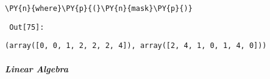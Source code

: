 {\par%
\vspace{-1\baselineskip}%
}%
\begin{notebookcell}[75]%
\begin{addmargin}[\cellleftmargin]{0em}%
{\smaller%
\par%
%
\vspace{-1\smallerfontscale}%
\begin{Verbatim}[commandchars=\\\{\}]
\PY{n}{where}\PY{p}{(}\PY{n}{mask}\PY{p}{)}
\end{Verbatim}
%
\par%
\vspace{-1\smallerfontscale}}%
\end{addmargin}
\end{notebookcell}

\par\vspace{1\smallerfontscale}%
    
        {\par%
        \vspace{-1\smallerfontscale}%
        \noindent%
        \begin{minipage}{\cellleftmargin}%
    \hfill%
    {\smaller%
    \tt%
    \color{nbframe-out-prompt}%
    Out[75]:}%
    \hspace{\inputpadding}%
    \hspace{0em}%
    \hspace{3pt}%
    \end{minipage}%
        }%
    \begin{addmargin}[\cellleftmargin]{0em}%
    {\smaller%
    \vspace{-1\smallerfontscale}%
    
    
    
    \begin{verbatim}
(array([0, 0, 1, 2, 2, 2, 4]), array([2, 4, 1, 0, 1, 4, 0]))
    \end{verbatim}

    
}%
    \end{addmargin}%

    \subparagraph{Linear Algebra}



